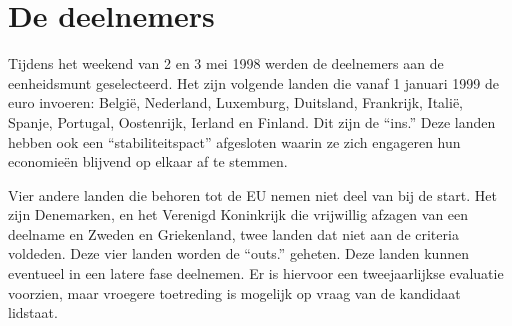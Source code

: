 \chapter{De deelnemers}

Tijdens het weekend van 2 en 3 mei 1998 werden de deelnemers aan de
eenheidsmunt geselecteerd. Het zijn volgende landen die vanaf 1
januari 1999 de euro invoeren: Belgi\"e, Nederland, Luxemburg,
Duitsland, Frankrijk, Itali\"e, Spanje, Portugal, Oostenrijk, Ierland
en Finland. Dit zijn de ``ins.'' Deze landen hebben ook een
``stabiliteitspact'' afgesloten waarin ze zich engageren hun
economie\"en blijvend op elkaar af te stemmen.

Vier andere landen die behoren tot de EU nemen niet deel van bij de
start. Het zijn Denemarken, en het Verenigd Koninkrijk die
vrijwillig afzagen van een deelname en Zweden en Griekenland, twee
landen dat niet aan de criteria voldeden. Deze vier landen worden de
``outs.'' geheten. Deze landen kunnen eventueel in een latere fase
deelnemen. Er is hiervoor een tweejaarlijkse evaluatie voorzien,
maar vroegere toetreding is mogelijk op vraag van de kandidaat
lidstaat.